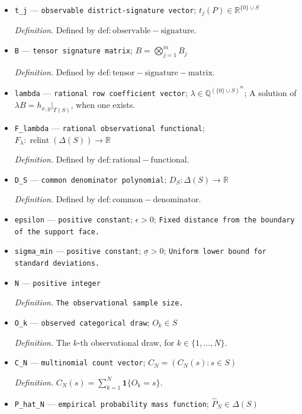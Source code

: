 \documentclass{article}
\begin{document}
\begin{itemize}
  \item \texttt{t\_\allowbreak{}j} --- \texttt{observable district-\allowbreak{}signature vector}; \(t_j(P)\in\mathbb R^{\{0\}\cup S}\)
  \par\smallskip\noindent\emph{Definition.} Defined by \(\mathrm{def:observable-signature}\).
  \item \texttt{B} --- \texttt{tensor signature matrix}; \(B=\bigotimes_{j=1}^mB_j\)
  \par\smallskip\noindent\emph{Definition.} Defined by \(\mathrm{def:tensor-signature-matrix}\).
  \item \texttt{lambda} --- \texttt{rational row coefficient vector}; \(\lambda\in\mathbb Q^{(\{0\}\cup S)^m}\); A solution of \(\lambda B=h_{x,y}|_{T(S)}\), when one exists.
  \item \texttt{F\_\allowbreak{}lambda} --- \texttt{rational observational functional}; \(F_{\lambda}:\operatorname{relint}(\Delta(S))\to\mathbb R\)
  \par\smallskip\noindent\emph{Definition.} Defined by \(\mathrm{def:rational-functional}\).
  \item \texttt{D\_\allowbreak{}S} --- \texttt{common denominator polynomial}; \(D_S:\Delta(S)\to\mathbb R\)
  \par\smallskip\noindent\emph{Definition.} Defined by \(\mathrm{def:common-denominator}\).
  \item \texttt{epsilon} --- \texttt{positive constant}; \(\epsilon>0\); \texttt{Fixed distance from the boundary of the support face.}
  \item \texttt{sigma\_\allowbreak{}min} --- \texttt{positive constant}; \(\underline\sigma>0\); \texttt{Uniform lower bound for standard deviations.}
  \item \texttt{N} --- \texttt{positive integer}
  \par\smallskip\noindent\emph{Definition.} \texttt{The observational sample size.}
  \item \texttt{O\_\allowbreak{}k} --- \texttt{observed categorical draw}; \(O_k\in S\)
  \par\smallskip\noindent\emph{Definition.} The \(k\)-th observational draw, for \(k\in\{1,\ldots,N\}\).
  \item \texttt{C\_\allowbreak{}N} --- \texttt{multinomial count vector}; \(C_N=(C_N(s):s\in S)\)
  \par\smallskip\noindent\emph{Definition.} \(C_N(s)=\sum_{k=1}^N\mathbf 1\{O_k=s\}\).
  \item \texttt{P\_\allowbreak{}hat\_\allowbreak{}N} --- \texttt{empirical probability mass function}; \(\widehat P_N\in\Delta(S)\)

\end{itemize}
\end{document}
